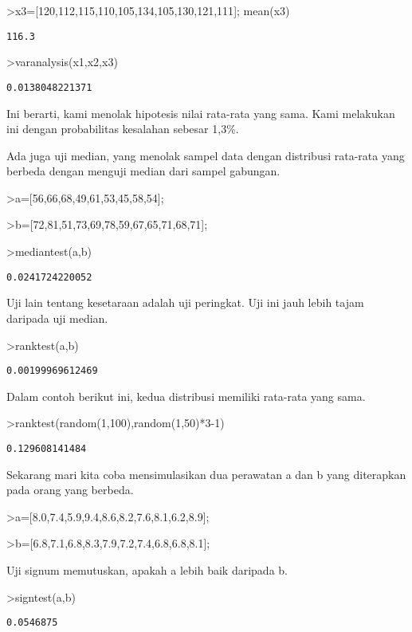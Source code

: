 \documentclass[
]{book}
\begin{document}
\textgreater x3={[}120,112,115,110,105,134,105,130,121,111{]}; mean(x3)

\begin{verbatim}
116.3
\end{verbatim}

\textgreater varanalysis(x1,x2,x3)

\begin{verbatim}
0.0138048221371
\end{verbatim}

Ini berarti, kami menolak hipotesis nilai rata-rata yang sama. Kami melakukan ini dengan probabilitas kesalahan sebesar 1,3\%.

Ada juga uji median, yang menolak sampel data dengan distribusi rata-rata yang berbeda dengan menguji median dari sampel gabungan.

\textgreater a={[}56,66,68,49,61,53,45,58,54{]};

\textgreater b={[}72,81,51,73,69,78,59,67,65,71,68,71{]};

\textgreater mediantest(a,b)

\begin{verbatim}
0.0241724220052
\end{verbatim}

Uji lain tentang kesetaraan adalah uji peringkat. Uji ini jauh lebih tajam daripada uji median.

\textgreater ranktest(a,b)

\begin{verbatim}
0.00199969612469
\end{verbatim}

Dalam contoh berikut ini, kedua distribusi memiliki rata-rata yang sama.

\textgreater ranktest(random(1,100),random(1,50)*3-1)

\begin{verbatim}
0.129608141484
\end{verbatim}

Sekarang mari kita coba mensimulasikan dua perawatan a dan b yang diterapkan pada orang yang berbeda.

\textgreater a={[}8.0,7.4,5.9,9.4,8.6,8.2,7.6,8.1,6.2,8.9{]};

\textgreater b={[}6.8,7.1,6.8,8.3,7.9,7.2,7.4,6.8,6.8,8.1{]};

Uji signum memutuskan, apakah a lebih baik daripada b.

\textgreater signtest(a,b)

\begin{verbatim}
0.0546875
\end{verbatim}
\end{document}
